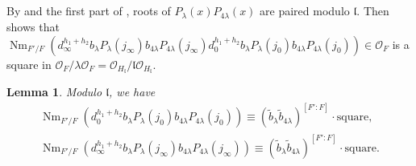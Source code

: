 \documentclass{amsart}
\numberwithin{equation}{subsection}
\numberwithin{theorem}{section}
\newtheorem{lemma}[theorem]{Lemma}
\theoremstyle{definition}
\theoremstyle{remark}
\newcommand{\cO}{\mathcal{O}}
\DeclareMathOperator{\Nm}{Nm}
\begin{document}
\subsection{} \label{sec:main2} By  and the first part of , roots of $P_{\lambda}(x)P_{4\lambda}(x)$ are paired modulo $\mathfrak{l}$. Then  shows that $\Nm_{F'/F}(d_{\infty}^{h_1+h_2} b_{\lambda} P_{\lambda}(j_{\infty}) b_{4\lambda} P_{4\lambda}(j_{\infty})d_{0}^{h_1+h_2} b_{\lambda} P_{\lambda}(j_{0}) b_{4\lambda} P_{4\lambda}(j_0))\in \cO_F$ is a square in  $\cO_F/\lambda \cO_F = \cO_{H_{\mathfrak{l}}}/\mathfrak{l}\cO_{H_{\mathfrak{l}}}$. 
\begin{lemma}\label{lem:square}
    Modulo $\mathfrak{l}$, we have \begin{align}
        \Nm_{F'/F}(d_{0}^{h_1+h_2} b_{\lambda} P_{\lambda}(j_{0}) b_{4\lambda} P_{4\lambda}(j_0)) \equiv (\tilde{b}_\lambda \tilde{b}_{4\lambda})^{[F':F]} \cdot \text{square}, \label{eq:sqj0}\\
        \Nm_{F'/F}(d_{\infty}^{h_1+h_2} b_{\lambda} P_{\lambda}(j_{\infty}) b_{4\lambda} P_{4\lambda}(j_{\infty})) \equiv (\tilde{b}_\lambda \tilde{b}_{4\lambda})^{[F':F]} \cdot \text{square}.\label{eq:sqjinfty}
    \end{align}
\end{lemma}
\end{document}
